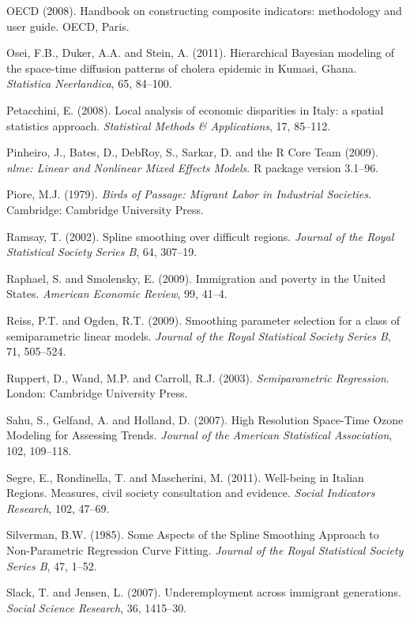 \documentclass[12pt]{article}
\theoremstyle{definition}
\theoremstyle{plain}
\begin{document}
\begin{thebibliography}{99}
\bibitem{} OECD (2008). Handbook on constructing composite indicators: methodology and user guide. OECD, Paris.

\bibitem{} Osei, F.B., Duker, A.A. and Stein, A. (2011). Hierarchical Bayesian modeling of the space-time diffusion patterns of cholera epidemic in Kumasi, Ghana. \textit{Statistica Neerlandica}, 65, 84--100.

\bibitem{} Petacchini, E. (2008). Local analysis of economic disparities in Italy: a spatial statistics approach. \textit{Statistical Methods \& Applications}, 17, 85--112.

\bibitem{} Pinheiro, J., Bates, D., DebRoy, S., Sarkar, D. and the R Core Team (2009). \textit{nlme: Linear and Nonlinear Mixed Effects Models}. R package version 3.1--96.

\bibitem{} Piore, M.J. (1979). \textit{Birds of Passage: Migrant Labor in Industrial Societies}. Cambridge: Cambridge University Press.

\bibitem{} Ramsay, T. (2002). Spline smoothing over difficult regions. \textit{Journal of the Royal Statistical Society Series B}, 64, 307--19.

\bibitem{} Raphael, S. and Smolensky, E. (2009). Immigration and poverty in the United States. \textit{American Economic Review}, 99, 41--4.

\bibitem{} Reiss, P.T. and Ogden, R.T. (2009). Smoothing parameter selection for a class of semiparametric linear models. \textit{Journal of the Royal Statistical Society Series B}, 71, 505--524.

\bibitem{} Ruppert, D., Wand, M.P. and Carroll, R.J. (2003). \textit{Semiparametric Regression}. London: Cambridge University Press.

\bibitem{} Sahu, S., Gelfand, A. and Holland, D. (2007). High Resolution Space-Time Ozone Modeling for Assessing Trends. \textit{Journal of the American Statistical Association}, 102, 109--118.

\bibitem{} Segre, E., Rondinella, T. and Mascherini, M. (2011). Well-being in Italian Regions. Measures, civil society consultation and evidence. \textit{Social Indicators Research}, 102, 47--69.

\bibitem{} Silverman, B.W. (1985). Some Aspects of the Spline Smoothing Approach to Non-Parametric Regression Curve Fitting. \textit{Journal of the Royal Statistical Society Series B}, 47, 1--52.

\bibitem{} Slack, T. and Jensen, L. (2007). Underemployment across immigrant generations. \textit{Social Science Research}, 36, 1415--30.


\end{thebibliography}
\end{document}
